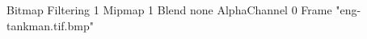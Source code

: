 {Bitmap
	{Filtering 1}
	{Mipmap 1}
	{Blend none}
	{AlphaChannel 0}
	{Frame "eng-tankman.tif.bmp"}
}
